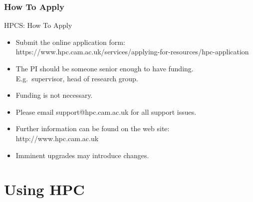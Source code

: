 \section{How To Apply}
\begin{frame}{HPCS: How To Apply}
\begin{itemize}
\item{Submit the online application form:\hfill\\
\qquad\alert{\tiny https://www.hpc.cam.ac.uk/services/applying-for-resources/hpc-application}}
\item{The PI should be someone senior enough to have funding.\hfill\\
\qquad E.g.\ \alert{supervisor}, \alert{head of research group}.}
\pause
\item{\color{red}Funding is not necessary.}
\pause
\item{Please email \alert{support@hpc.cam.ac.uk} for all support issues.}
\item{Further information can be found on the web site:\hfill\\
  \qquad \alert{http://www.hpc.cam.ac.uk}}
  \pause
  \item{\alert{Imminent upgrades may introduce changes.}}
\end{itemize}
\end{frame}

\part{Using HPC}
\frame{\partpage}




